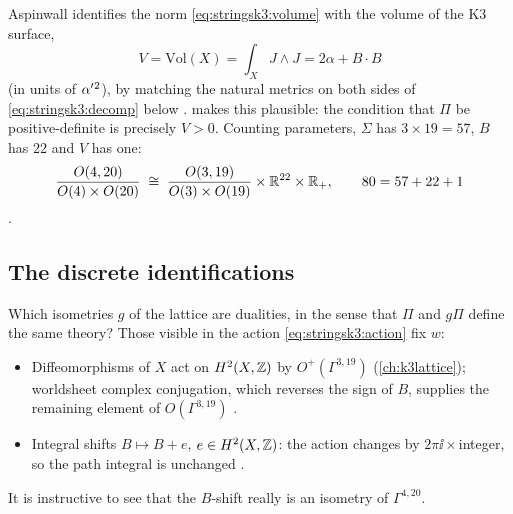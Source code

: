 Aspinwall identifies the norm \eqref{eq:stringsk3:volume} with the volume of the K3 surface,
\begin{equation}\label{eq:stringsk3:vol}
  V=\mathrm{Vol}(X)=\int_XJ\wedge J=2\alpha+B\cdot B
\end{equation}
(in units of $\alpha'{}^2$), by matching the natural metrics on both sides of
\eqref{eq:stringsk3:decomp} below 
\TL.  makes this plausible: the condition that $\Pi$ be
positive-definite is precisely $V>0$. Counting parameters, $\Sigma$ has $3\times19=57$, $B$
has $22$ and $V$ has one:
\begin{equation}\label{eq:stringsk3:decomp}
  \frac{O(4,20)}{O(4)\times O(20)}\;\cong\;\frac{O(3,19)}{O(3)\times O(19)}\times\mathbb{R}^{22}\times\mathbb{R}_+ ,
  \qquad 80=57+22+1
\end{equation}
.

\subsection{The discrete identifications}\label{sec:stringsk3:discrete}
Which isometries $g$ of the lattice are dualities, in the sense that $\Pi$ and $g\Pi$ define
the same theory? Those visible in the action \eqref{eq:stringsk3:action} fix $w$:
\begin{itemize}[leftmargin=*]
\item Diffeomorphisms of $X$ act on $H^2(X,\mathbb{Z})$ by $O^+(\Gamma^{3,19})$ (\cref{ch:k3lattice});
  worldsheet complex conjugation, which reverses the sign of $B$, supplies the remaining
  element of $O(\Gamma^{3,19})$ .
\item Integral shifts $B\mapsto B+e$, $e\in H^2(X,\mathbb{Z})$: the action changes by
  $2\pi\ii\times$integer, so the path integral is unchanged
  .
\end{itemize}
It is instructive to see that the $B$-shift really is an isometry of $\Gamma^{4,20}$.

